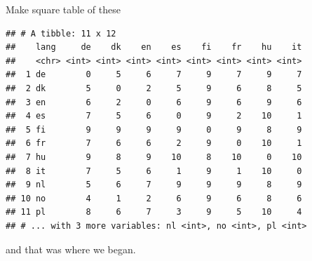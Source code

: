 \documentclass[
  ignorenonframetext,
]{beamer}
\newenvironment{Shaded}{\begin{snugshade}}{\end{snugshade}}
\newcommand{\DataTypeTok}[1]{\textcolor[rgb]{0.13,0.29,0.53}{#1}}
\newcommand{\KeywordTok}[1]{\textcolor[rgb]{0.13,0.29,0.53}{\textbf{#1}}}
\newcommand{\NormalTok}[1]{#1}
\newcommand{\OperatorTok}[1]{\textcolor[rgb]{0.81,0.36,0.00}{\textbf{#1}}}
\newcommand{\StringTok}[1]{\textcolor[rgb]{0.31,0.60,0.02}{#1}}
\begin{document}
\begin{frame}[fragile]{Make square table of these}
\protect\hypertarget{make-square-table-of-these}{}

\scriptsize

\begin{Shaded}
\end{Shaded}

\begin{verbatim}
## # A tibble: 11 x 12
##    lang     de    dk    en    es    fi    fr    hu    it
##    <chr> <int> <int> <int> <int> <int> <int> <int> <int>
##  1 de        0     5     6     7     9     7     9     7
##  2 dk        5     0     2     5     9     6     8     5
##  3 en        6     2     0     6     9     6     9     6
##  4 es        7     5     6     0     9     2    10     1
##  5 fi        9     9     9     9     0     9     8     9
##  6 fr        7     6     6     2     9     0    10     1
##  7 hu        9     8     9    10     8    10     0    10
##  8 it        7     5     6     1     9     1    10     0
##  9 nl        5     6     7     9     9     9     8     9
## 10 no        4     1     2     6     9     6     8     6
## 11 pl        8     6     7     3     9     5    10     4
## # ... with 3 more variables: nl <int>, no <int>, pl <int>
\end{verbatim}

\normalsize

and that was where we began.

\end{frame}
\end{document}
